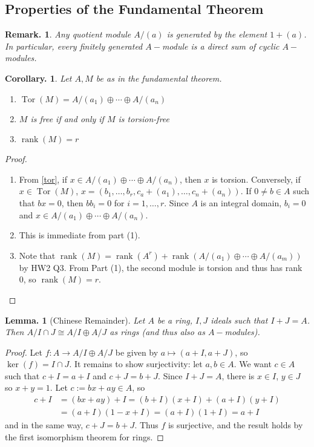 \documentclass[11pt, a4paper]{memoir}
\theoremstyle{change}
\newtheorem{lemma}[theorem]{Lemma.}
\newtheorem{corollary}[theorem]{Corollary.}
\theoremstyle{plain}
\theoremstyle{nonumberplain}
\newtheorem{remark}{Remark.}
\newtheorem{proof}{Proof}
\DeclareMathOperator{\rank}{rank}
\DeclareMathOperator{\Tor}{Tor}
\numberwithin{equation}{section}
\begin{document}
\subsection{Properties of the Fundamental Theorem}
\begin{remark}
    Any quotient module $A/(a)$ is generated by the element $1+(a)$.
    In particular, every finitely generated $A-$module is a direct sum of cyclic $A-$modules.
\end{remark}
\begin{corollary}
    Let $A,M$ be as in the fundamental theorem.
    \begin{enumerate}[nolistsep]
        \item $\Tor(M)=A/(a_1)\oplus\cdots\oplus A/(a_n)$
        \item $M$ is free if and only if $M$ is torsion-free
        \item $\rank(M)=r$
    \end{enumerate}
\end{corollary}
\begin{proof}
    \begin{enumerate}[nolistsep]
        \item From \cref{tor}, if $x\in A/(a_1)\oplus\cdots\oplus A/(a_n)$, then $x$ is torsion.
            Conversely, if $x\in\Tor(M)$, $x=(b_1,\ldots,b_r,c_a+(a_1),\ldots,c_n+(a_n))$.
            If $0\neq b\in A$ such that $bx=0$, then $bb_i=0$ for $i=1,\ldots,r$.
            Since $A$ is an integral domain, $b_i=0$ and $x\in A/(a_1)\oplus\cdots\oplus A/(a_n)$.
        \item This is immediate from part (1).
        \item Note that $\rank(M)=\rank(A^r)+\rank(A/(a_1)\oplus \cdots\oplus A/(a_m))$ by HW2 Q3.
            From Part (1), the second module is torsion and thus has rank 0, so $\rank(M)=r$.
    \end{enumerate}
\end{proof}
\begin{lemma}[Chinese Remainder]
    Let $A$ be a ring, $I,J$ ideals such that $I+J=A$.
    Then $A/I\cap J\cong A/I\oplus A/J$ as rings (and thus also as $A-$modules).
\end{lemma}
\begin{proof}
    Let $f:A\to A/I\oplus A/J$ be given by $a\mapsto(a+I,a+J)$, so $\ker(f)=I\cap J$.
    It remains to show surjectivity: let $a,b\in A$.
    We want $c\in A$ such that $c+I=a+I$ and $c+J=b+J$.
    Since $I+J=A$, there is $x\in I$, $y\in J$ so $x+y=1$.
    Let $c:=bx+ay\in A$, so
    \begin{align*}
        c+I &= (bx+ay)+I =(b+I)(x+I)+(a+I)(y+I)\\
            &= (a+I)(1-x+I)= (a+I)(1+I)= a+I
    \end{align*}
    and in the same way, $c+J=b+J$.
    Thus $f$ is surjective, and the result holds by the first isomorphism theorem for rings.
\end{proof}
\end{document}
